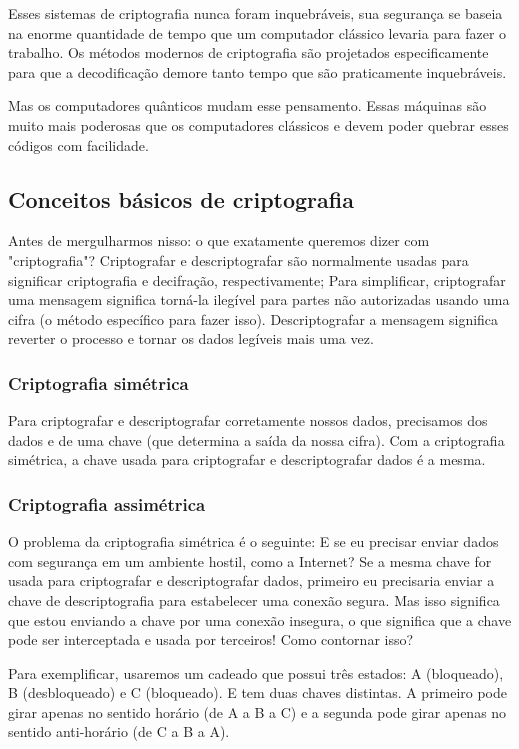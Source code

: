 Esses sistemas de criptografia nunca foram inquebráveis, sua segurança se baseia na enorme quantidade de tempo que um computador clássico levaria para fazer o trabalho. Os métodos modernos de criptografia são projetados especificamente para que a decodificação demore tanto tempo que são praticamente inquebráveis.

Mas os computadores quânticos mudam esse pensamento. Essas máquinas são muito mais poderosas que os computadores clássicos e devem poder quebrar esses códigos com facilidade.

\subsection{Conceitos básicos de criptografia}
Antes de mergulharmos nisso: o que exatamente queremos dizer com "criptografia"? Criptografar e descriptografar são normalmente usadas para significar criptografia e decifração, respectivamente; Para simplificar, criptografar uma mensagem significa torná-la ilegível para partes não autorizadas usando uma cifra (o método específico para fazer isso). Descriptografar a mensagem significa reverter o processo e tornar os dados legíveis mais uma vez.

\subsubsection{Criptografia simétrica}
Para criptografar e descriptografar corretamente nossos dados, precisamos dos dados e de uma chave (que determina a saída da nossa cifra).
Com a criptografia simétrica, a chave usada para criptografar e descriptografar dados é a mesma.

\subsubsection{Criptografia assimétrica}
O problema da criptografia simétrica é o seguinte: E se eu precisar enviar dados com segurança em um ambiente hostil, como a Internet? Se a mesma chave for usada para criptografar e descriptografar dados, primeiro eu precisaria enviar a chave de descriptografia para estabelecer uma conexão segura. Mas isso significa que estou enviando a chave por uma conexão insegura, o que significa que a chave pode ser interceptada e usada por terceiros! Como contornar isso? 

Para exemplificar, usaremos um cadeado que possui três estados: A (bloqueado), B (desbloqueado) e C (bloqueado).
E tem duas chaves distintas. A primeiro pode girar apenas no sentido horário (de A a B a C) e a segunda pode girar apenas no sentido anti-horário (de C a B a A).

